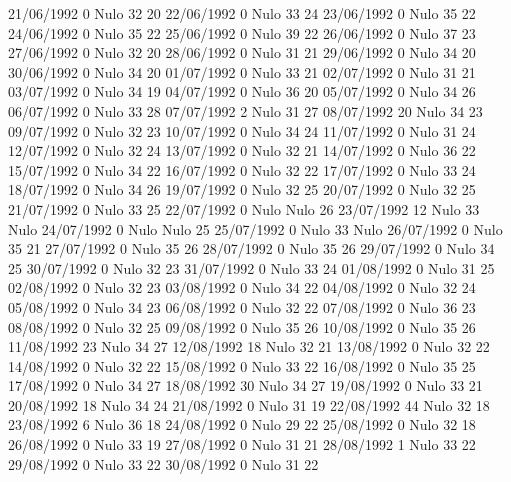 21/06/1992  0     Nulo    32     20 
22/06/1992  0     Nulo    33     24 
23/06/1992  0     Nulo    35     22 
24/06/1992  0     Nulo    35     22 
25/06/1992  0     Nulo    39     22 
26/06/1992  0     Nulo    37     23 
27/06/1992  0     Nulo    32     20 
28/06/1992  0     Nulo    31     21 
29/06/1992  0     Nulo    34     20 
30/06/1992  0     Nulo    34     20 
01/07/1992  0     Nulo    33     21 
02/07/1992  0     Nulo    31     21 
03/07/1992  0     Nulo    34     19 
04/07/1992  0     Nulo    36     20 
05/07/1992  0     Nulo    34     26 
06/07/1992  0     Nulo    33     28 
07/07/1992  2     Nulo    31     27 
08/07/1992  20    Nulo    34     23 
09/07/1992  0     Nulo    32     23 
10/07/1992  0     Nulo    34     24 
11/07/1992  0     Nulo    31     24 
12/07/1992  0     Nulo    32     24 
13/07/1992  0     Nulo    32     21 
14/07/1992  0     Nulo    36     22 
15/07/1992  0     Nulo    34     22 
16/07/1992  0     Nulo    32     22 
17/07/1992  0     Nulo    33     24 
18/07/1992  0     Nulo    34     26 
19/07/1992  0     Nulo    32     25 
20/07/1992  0     Nulo    32     25 
21/07/1992  0     Nulo    33     25 
22/07/1992  0     Nulo   Nulo    26 
23/07/1992  12    Nulo    33    Nulo
24/07/1992  0     Nulo   Nulo    25 
25/07/1992  0     Nulo    33    Nulo
26/07/1992  0     Nulo    35     21 
27/07/1992  0     Nulo    35     26 
28/07/1992  0     Nulo    35     26 
29/07/1992  0     Nulo    34     25 
30/07/1992  0     Nulo    32     23 
31/07/1992  0     Nulo    33     24 
01/08/1992  0     Nulo    31     25 
02/08/1992  0     Nulo    32     23 
03/08/1992  0     Nulo    34     22 
04/08/1992  0     Nulo    32     24 
05/08/1992  0     Nulo    34     23 
06/08/1992  0     Nulo    32     22 
07/08/1992  0     Nulo    36     23 
08/08/1992  0     Nulo    32     25 
09/08/1992  0     Nulo    35     26 
10/08/1992  0     Nulo    35     26 
11/08/1992  23    Nulo    34     27 
12/08/1992  18    Nulo    32     21 
13/08/1992  0     Nulo    32     22 
14/08/1992  0     Nulo    32     22 
15/08/1992  0     Nulo    33     22 
16/08/1992  0     Nulo    35     25 
17/08/1992  0     Nulo    34     27 
18/08/1992  30    Nulo    34     27 
19/08/1992  0     Nulo    33     21 
20/08/1992  18    Nulo    34     24 
21/08/1992  0     Nulo    31     19 
22/08/1992  44    Nulo    32     18 
23/08/1992  6     Nulo    36     18 
24/08/1992  0     Nulo    29     22 
25/08/1992  0     Nulo    32     18 
26/08/1992  0     Nulo    33     19 
27/08/1992  0     Nulo    31     21 
28/08/1992  1     Nulo    33     22 
29/08/1992  0     Nulo    33     22 
30/08/1992  0     Nulo    31     22 
